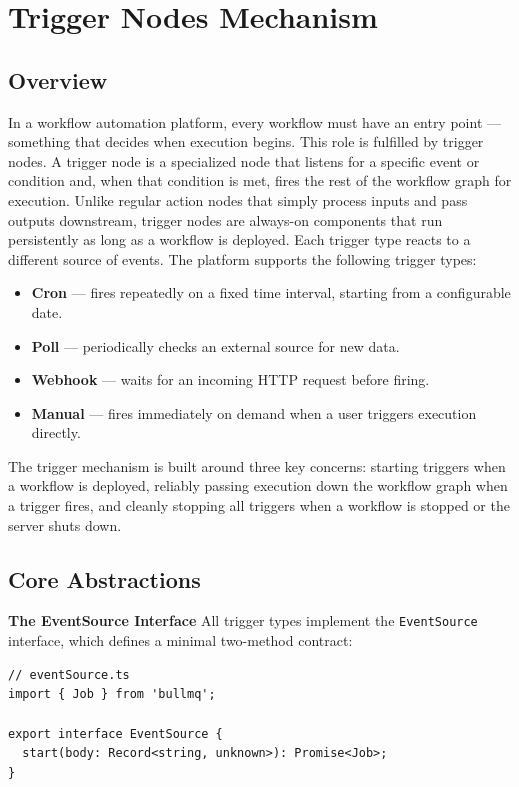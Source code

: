 \section{Trigger Nodes Mechanism}

\subsection{Overview}
In a workflow automation platform, every workflow must have an entry point — something that decides when execution begins. This role is fulfilled by trigger nodes. A trigger node is a specialized node that listens for a specific event or condition and, when that condition is met, fires the rest of the workflow graph for execution.
Unlike regular action nodes that simply process inputs and pass outputs downstream, trigger nodes are always-on components that run persistently as long as a workflow is deployed. Each trigger type reacts to a different source of events. The platform supports the following trigger types:
\begin{itemize}
  \item \textbf{Cron} --- fires repeatedly on a fixed time interval, starting from a configurable date.
  \item \textbf{Poll} --- periodically checks an external source for new data.
  \item \textbf{Webhook} --- waits for an incoming HTTP request before firing.
  \item \textbf{Manual} --- fires immediately on demand when a user triggers execution directly.
\end{itemize}

The trigger mechanism is built around three key concerns: starting triggers when a workflow is deployed, reliably passing execution down the workflow graph when a trigger fires, and cleanly stopping all triggers when a workflow is stopped or the server shuts down.

\subsection{Core Abstractions}
\textbf{The EventSource Interface}
All trigger types implement the \texttt{EventSource} interface, which defines a minimal two-method contract:
\begin{lstlisting}
// eventSource.ts
import { Job } from 'bullmq';
 
export interface EventSource {
  start(body: Record<string, unknown>): Promise<Job>;
}
\end{lstlisting}

